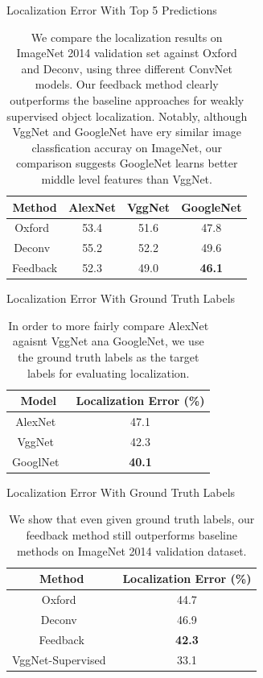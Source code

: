 \begin{table}
\centering
Localization Error With Top 5 Predictions
\begin{tabular}{|c|c|c|c|} \hline
Method & AlexNet & VggNet & GoogleNet \\ \hline
Oxford~\cite{simonyan2013deep} & 53.4 & 51.6 & 47.8 \\ \hline
Deconv~\cite{zeiler2014visualizing} & 55.2 & 52.2 & 49.6\\ \hline
Feedback & 52.3 & 49.0 & \textbf{46.1} \\ \hline 
\end{tabular}
\caption{We compare the localization results on ImageNet 2014 validation set against Oxford and Deconv, using three different ConvNet models. Our feedback method clearly outperforms the baseline approaches for weakly supervised object localization. Notably, although VggNet and GoogleNet have ery similar image classfication accuray on ImageNet, our comparison suggests GoogleNet learns better middle level features than VggNet.}
\label{tab:localization_accuracy_top5}
\end{table}

\begin{table}
\centering
Localization Error With Ground Truth Labels
\begin{tabular}{|c|c|}
\hline
Model & Localization Error (\%) \\ \hline 
AlexNet~\cite{Krizhevsky2012ImageNet} & 47.1 \\ \hline
VggNet~\cite{Simonyan2014Very} & 42.3 \\ \hline
GooglNet~\cite{Szegedy2014Going} & \textbf{40.1} \\ \hline
\end{tabular}
\caption{In order to more fairly compare AlexNet agaisnt VggNet ana GoogleNet, we use the ground truth labels as the target labels for evaluating localization.}
\label{tab:localization_model_compare}
\end{table}

\begin{table}
\centering
Localization Error With Ground Truth Labels
\begin{tabular}{|c|c|}
\hline
Method & Localization Error (\%) \\ \hline
Oxford~\cite{simonyan2013deep} & 44.7 \\ \hline
Deconv~\cite{zeiler2014visualizing} & 46.9 \\ \hline
Feedback & \textbf{42.3} \\ \hline
VggNet-Supervised~\cite{Simonyan2014Very} & 33.1 \\ \hline
\end{tabular}
\caption{We show that even given ground truth labels, our feedback method still outperforms baseline methods on ImageNet 2014 validation dataset.}
\label{tab:localization_accuracy}
\end{table}

